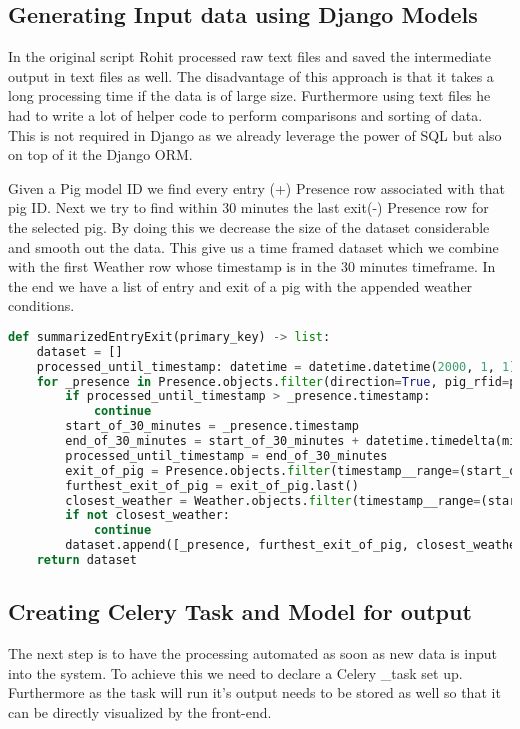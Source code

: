 \subsection{Generating Input data using Django Models}
In the original script Rohit processed raw text files and saved the intermediate output in text files as well.
The disadvantage of this approach is that it takes a long processing time if the data is of large size. Furthermore
using text files he had to write a lot of helper code to perform comparisons and sorting of data. This is not required in Django
as we already leverage the power of SQL but also on top of it the Django ORM.

Given a Pig model ID we find every entry (+) Presence row associated with that pig ID. Next we try to find within 30 minutes the last
exit(-) Presence row for the selected pig. By doing this we decrease the size of the dataset considerable and smooth out the data.
This give us a time framed dataset which we combine with the first Weather row whose timestamp is in the 30 minutes timeframe.
In the end we have a list of entry and exit of a pig with the appended weather conditions.

\begin{lstlisting}[language={Python}]
def summarizedEntryExit(primary_key) -> list:
    dataset = []
    processed_until_timestamp: datetime = datetime.datetime(2000, 1, 1)
    for _presence in Presence.objects.filter(direction=True, pig_rfid=primary_key):
        if processed_until_timestamp > _presence.timestamp:
            continue
        start_of_30_minutes = _presence.timestamp
        end_of_30_minutes = start_of_30_minutes + datetime.timedelta(minutes=30)
        processed_until_timestamp = end_of_30_minutes
        exit_of_pig = Presence.objects.filter(timestamp__range=(start_of_30_minutes, end_of_30_minutes), direction=False, pig_rfid=_presence.pig_rfid).order_by('timestamp')
        furthest_exit_of_pig = exit_of_pig.last()
        closest_weather = Weather.objects.filter(timestamp__range=(start_of_30_minutes, end_of_30_minutes)).first()
        if not closest_weather:
            continue
        dataset.append([_presence, furthest_exit_of_pig, closest_weather])
    return dataset
\end{lstlisting}

\subsection{Creating Celery Task and Model for output}
The next step is to have the processing automated as soon as new data is input into the system. To achieve this we need to
declare a Celery \@shared\_task set up. Furthermore as the task will run it's output needs to be stored as well so that 
it can be directly visualized by the front-end.

